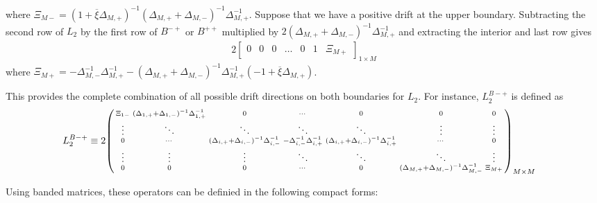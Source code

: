 \documentclass[11pt]{article}
\newenvironment{psmallmatrix}
{\left(\begin{smallmatrix}}
	{\end{smallmatrix}\right)}
\theoremstyle{definition}
\begin{document}
where $\Xi_{M-} = (1 + \overline{\xi} \Delta_{M,+})^{-1} (\Delta_{M,+} + \Delta_{M,-})^{-1}  \Delta_{M,+}^{-1}$. Suppose that we have a positive drift at the upper boundary. Subtracting the second row of $L_2$ by the first row of $B^{-+}$ or $B^{++}$ multiplied by $2(\Delta_{M,+} + \Delta_{M,-})^{-1} \Delta_{M,+}^{-1} $ and extracting the interior and last row gives
\begin{align}
2\begin{bmatrix}
0 &0&0&\dots&0&1&\Xi_{M+}
\end{bmatrix}_{1\times M}
\end{align}
where $\Xi_{M+} = -\Delta_{M,-}^{-1} \Delta_{M,+}^{-1} - ( \Delta_{M,+} + \Delta_{M,-} )^{-1} \Delta_{M,+}^{-1} (-1 + \overline{\xi} \Delta_{M,+})  $.

This provides the complete combination of all possible drift directions on both boundaries for $L_2$. For instance, $L_2^{B-+}$ is defined as
\begin{align}
L_2^{B-+} &\equiv  2 \begin{psmallmatrix}
\Xi_{1-} &
(\Delta_{1,+}+\Delta_{1,-})^{-1} \Delta_{1,+}^{-1}
&0&\cdots&0&0&0 \\
\vdots&\ddots&\ddots&\ddots&\ddots&\vdots&\vdots\\
0&\cdots&
(\Delta_{i,+}+\Delta_{i,-})^{-1} \Delta_{i,-}^{-1} &
-\Delta_{i,-}^{-1} \Delta_{i,+}^{-1}  &
(\Delta_{i,+}+\Delta_{i,-})^{-1} \Delta_{i,+}^{-1}&\cdots&0 \\
\vdots&\vdots&\vdots&\ddots&\ddots&\ddots&\vdots\\
0&0&0&\cdots&0&(\Delta_{M,+}+\Delta_{M,-})^{-1} \Delta_{M,-}^{-1}&\Xi_{M+}
\end{psmallmatrix}_{M\times M}
\end{align}



Using banded matrices, these operators can be definied in the following compact forms:
\end{document}
